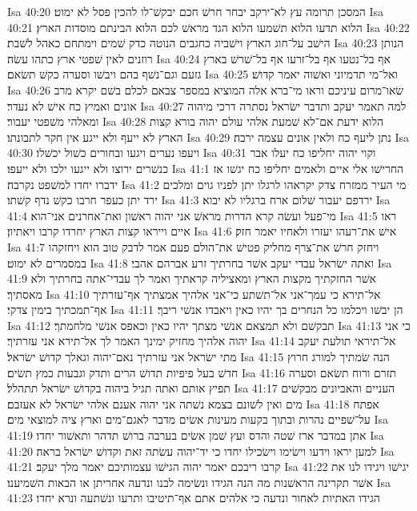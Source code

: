Isa 40:20  המסכן תרומה עץ לא־ירקב יבחר חרשׁ חכם יבקשׁ־לו להכין פסל לא ימוט׃
Isa 40:21  הלוא תדעו הלוא תשׁמעו הלוא הגד מראשׁ לכם הלוא הבינתם מוסדות הארץ׃
Isa 40:22  הישׁב על־חוג הארץ וישׁביה כחגבים הנוטה כדק שׁמים וימתחם כאהל לשׁבת׃
Isa 40:23  הנותן רוזנים לאין שׁפטי ארץ כתהו עשׂה׃
Isa 40:24  אף בל־נטעו אף בל־זרעו אף בל־שׁרשׁ בארץ גזעם וגם־נשׁף בהם ויבשׁו וסערה כקשׁ תשׂאם׃
Isa 40:25  ואל־מי תדמיוני ואשׁוה יאמר קדושׁ׃
Isa 40:26  שׂאו־מרום עיניכם וראו מי־ברא אלה המוציא במספר צבאם לכלם בשׁם יקרא מרב אונים ואמיץ כח אישׁ לא נעדר׃
Isa 40:27  למה תאמר יעקב ותדבר ישׂראל נסתרה דרכי מיהוה ומאלהי משׁפטי יעבור׃
Isa 40:28  הלוא ידעת אם־לא שׁמעת אלהי עולם יהוה בורא קצות הארץ לא ייעף ולא ייגע אין חקר לתבונתו׃
Isa 40:29  נתן ליעף כח ולאין אונים עצמה ירבה׃
Isa 40:30  ויעפו נערים ויגעו ובחורים כשׁול יכשׁלו׃
Isa 40:31  וקוי יהוה יחליפו כח יעלו אבר כנשׁרים ירוצו ולא ייגעו ילכו ולא ייעפו׃
Isa 41:1  החרישׁו אלי איים ולאמים יחליפו כח יגשׁו אז ידברו יחדו למשׁפט נקרבה׃
Isa 41:2  מי העיר ממזרח צדק יקראהו לרגלו יתן לפניו גוים ומלכים ירד יתן כעפר חרבו כקשׁ נדף קשׁתו׃
Isa 41:3  ירדפם יעבור שׁלום ארח ברגליו לא יבוא׃
Isa 41:4  מי־פעל ועשׂה קרא הדרות מראשׁ אני יהוה ראשׁון ואת־אחרנים אני־הוא׃
Isa 41:5  ראו איים וייראו קצות הארץ יחרדו קרבו ויאתיון׃
Isa 41:6  אישׁ את־רעהו יעזרו ולאחיו יאמר חזק׃
Isa 41:7  ויחזק חרשׁ את־צרף מחליק פטישׁ את־הולם פעם אמר לדבק טוב הוא ויחזקהו במסמרים לא ימוט׃
Isa 41:8  ואתה ישׂראל עבדי יעקב אשׁר בחרתיך זרע אברהם אהבי׃
Isa 41:9  אשׁר החזקתיך מקצות הארץ ומאציליה קראתיך ואמר לך עבדי־אתה בחרתיך ולא מאסתיך׃
Isa 41:10  אל־תירא כי עמך־אני אל־תשׁתע כי־אני אלהיך אמצתיך אף־עזרתיך אף־תמכתיך בימין צדקי׃
Isa 41:11  הן יבשׁו ויכלמו כל הנחרים בך יהיו כאין ויאבדו אנשׁי ריבך׃
Isa 41:12  תבקשׁם ולא תמצאם אנשׁי מצתך יהיו כאין וכאפס אנשׁי מלחמתך׃
Isa 41:13  כי אני יהוה אלהיך מחזיק ימינך האמר לך אל־תירא אני עזרתיך׃
Isa 41:14  אל־תיראי תולעת יעקב מתי ישׂראל אני עזרתיך נאם־יהוה וגאלך קדושׁ ישׂראל׃
Isa 41:15  הנה שׂמתיך למורג חרוץ חדשׁ בעל פיפיות תדושׁ הרים ותדק וגבעות כמץ תשׂים׃
Isa 41:16  תזרם ורוח תשׂאם וסערה תפיץ אותם ואתה תגיל ביהוה בקדושׁ ישׂראל תתהלל׃
Isa 41:17  העניים והאביונים מבקשׁים מים ואין לשׁונם בצמא נשׁתה אני יהוה אענם אלהי ישׂראל לא אעזבם׃
Isa 41:18  אפתח על־שׁפיים נהרות ובתוך בקעות מעינות אשׂים מדבר לאגם־מים וארץ ציה למוצאי מים׃
Isa 41:19  אתן במדבר ארז שׁטה והדס ועץ שׁמן אשׂים בערבה ברושׁ תדהר ותאשׁור יחדו׃
Isa 41:20  למען יראו וידעו וישׂימו וישׂכילו יחדו כי יד־יהוה עשׂתה זאת וקדושׁ ישׂראל בראה׃
Isa 41:21  קרבו ריבכם יאמר יהוה הגישׁו עצמותיכם יאמר מלך יעקב׃
Isa 41:22  יגישׁו ויגידו לנו את אשׁר תקרינה הראשׁנות מה הנה הגידו ונשׂימה לבנו ונדעה אחריתן או הבאות השׁמיענו׃
Isa 41:23  הגידו האתיות לאחור ונדעה כי אלהים אתם אף־תיטיבו ותרעו ונשׁתעה ונרא יחדו׃
